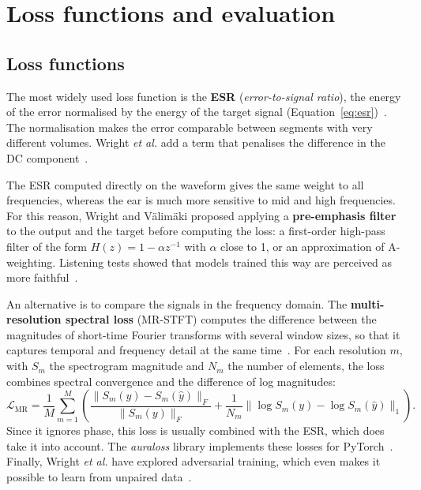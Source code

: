 \documentclass[ENG]{TFUOC}%
\begin{document}
\section{Loss functions and evaluation}
\label{s:avaluacio}

\subsection{Loss functions}

The most widely used loss function is the \textbf{ESR} (\emph{error-to-signal ratio}), the energy of the error normalised by the energy of the target signal (Equation~\eqref{eq:esr})~\cite{wright2019}. The normalisation makes the error comparable between segments with very different volumes. Wright \emph{et al.} add a term that penalises the difference in the DC component~\cite{wright2020}.

The ESR computed directly on the waveform gives the same weight to all frequencies, whereas the ear is much more sensitive to mid and high frequencies. For this reason, Wright and Välimäki proposed applying a \textbf{pre-emphasis filter} to the output and the target before computing the loss: a first-order high-pass filter of the form $H(z)=1-\alpha z^{-1}$ with $\alpha$ close to 1, or an approximation of A-weighting. Listening tests showed that models trained this way are perceived as more faithful~\cite{wright2020percep}.

An alternative is to compare the signals in the frequency domain. The \textbf{multi-resolution spectral loss} (MR-STFT) computes the difference between the magnitudes of short-time Fourier transforms with several window sizes, so that it captures temporal and frequency detail at the same time~\cite{yamamoto2020}. For each resolution $m$, with $S_m$ the spectrogram magnitude and $N_m$ the number of elements, the loss combines spectral convergence and the difference of log magnitudes:
\begin{equation}
\mathcal{L}_{\mathrm{MR}} = \frac{1}{M}\sum_{m=1}^{M}\left(\frac{\lVert S_m(y)-S_m(\hat{y})\rVert_F}{\lVert S_m(y)\rVert_F} + \frac{1}{N_m}\big\lVert \log S_m(y)-\log S_m(\hat{y})\big\rVert_1\right).
\end{equation}
Since it ignores phase, this loss is usually combined with the ESR, which does take it into account. The \emph{auraloss} library implements these losses for PyTorch~\cite{steinmetz2020}. Finally, Wright \emph{et al.} have explored adversarial training, which even makes it possible to learn from unpaired data~\cite{wright2023}.
\end{document}
